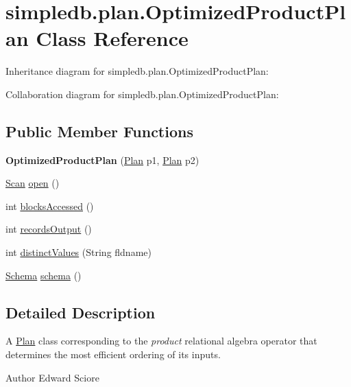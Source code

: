 \hypertarget{classsimpledb_1_1plan_1_1OptimizedProductPlan}{}\section{simpledb.\+plan.\+Optimized\+Product\+Plan Class Reference}
\label{classsimpledb_1_1plan_1_1OptimizedProductPlan}


Inheritance diagram for simpledb.\+plan.\+Optimized\+Product\+Plan\+:


Collaboration diagram for simpledb.\+plan.\+Optimized\+Product\+Plan\+:
\subsection*{Public Member Functions}
\begin{DoxyCompactItemize}
\item 
\mbox{\label{classsimpledb_1_1plan_1_1OptimizedProductPlan_afaa675021c19ffebca4f4086a3fe9fbd}} 
{\bfseries Optimized\+Product\+Plan} (\hyperlink{interfacesimpledb_1_1plan_1_1Plan}{Plan} p1, \hyperlink{interfacesimpledb_1_1plan_1_1Plan}{Plan} p2)
\item 
\hyperlink{interfacesimpledb_1_1query_1_1Scan}{Scan} \hyperlink{classsimpledb_1_1plan_1_1OptimizedProductPlan_a885a442c4708535114b8e7a8b022a5f7}{open} ()
\item 
int \hyperlink{classsimpledb_1_1plan_1_1OptimizedProductPlan_a52b0ca647203a27b037e001abda794ae}{blocks\+Accessed} ()
\item 
int \hyperlink{classsimpledb_1_1plan_1_1OptimizedProductPlan_acf3d4c379376683928f83fa56de38d60}{records\+Output} ()
\item 
int \hyperlink{classsimpledb_1_1plan_1_1OptimizedProductPlan_a53c2cbca815961d5349736f735fa2a0b}{distinct\+Values} (String fldname)
\item 
\hyperlink{classsimpledb_1_1record_1_1Schema}{Schema} \hyperlink{classsimpledb_1_1plan_1_1OptimizedProductPlan_aaeadc35607f4bce16a6f57988e8737b5}{schema} ()
\end{DoxyCompactItemize}


\subsection{Detailed Description}
A \hyperlink{interfacesimpledb_1_1plan_1_1Plan}{Plan} class corresponding to the {\itshape product} relational algebra operator that determines the most efficient ordering of its inputs. \begin{DoxyAuthor}{Author}
Edward Sciore 
\end{DoxyAuthor}


